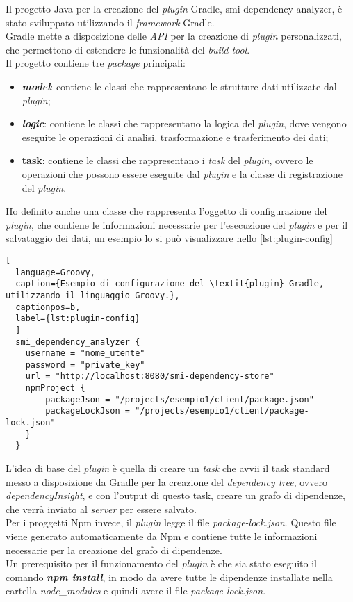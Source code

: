 Il progetto Java per la creazione del \textit{plugin} Gradle, smi-dependency-analyzer, è stato sviluppato utilizzando il \textit{framework} Gradle.\\
Gradle mette a disposizione delle \textit{API} per la creazione di \textit{plugin} personalizzati,
che permettono di estendere le funzionalità del \textit{build tool}.\\
Il progetto contiene tre \textit{package} principali:
\begin{itemize}
  \item \textbf{\textit{model}}: contiene le classi che rappresentano le strutture dati utilizzate dal \textit{plugin};
  \item \textbf{\textit{logic}}: contiene le classi che rappresentano la logica del \textit{plugin}, dove vengono eseguite le operazioni di analisi, 
  trasformazione e trasferimento dei dati;
  \item \textbf{task}: contiene le classi che rappresentano i \textit{task} del \textit{plugin}, ovvero le operazioni che possono essere eseguite dal \textit{plugin} 
  e la classe di registrazione del \textit{plugin}.
\end{itemize}

Ho definito anche una classe che rappresenta l'oggetto di configurazione del \textit{plugin}, 
che contiene le informazioni necessarie per l'esecuzione del \textit{plugin} e per il salvataggio dei dati, un esempio lo si può visualizzare nello \snippet{} \ref*{lst:plugin-config}

\begin{lstlisting}[
  language=Groovy, 
  caption={Esempio di configurazione del \textit{plugin} Gradle, utilizzando il linguaggio Groovy.},
  captionpos=b, 
  label={lst:plugin-config}
  ]
  smi_dependency_analyzer {
    username = "nome_utente"
    password = "private_key"
    url = "http://localhost:8080/smi-dependency-store"
    npmProject {
        packageJson = "/projects/esempio1/client/package.json"
        packageLockJson = "/projects/esempio1/client/package-lock.json"
    }
  }
\end{lstlisting}

L'idea di base del \textit{plugin} è quella di creare un \textit{task} che avvii il task standard messo a disposizione da Gradle
per la creazione del \textit{dependency tree}, ovvero \textit{dependencyInsight}, e con l'output di questo task,
creare un grafo di dipendenze, che verrà inviato al \textit{server} per essere salvato.\\
Per i proggetti Npm invece, il \textit{plugin} legge il file \textit{package-lock.json}. Questo file viene generato automaticamente
da Npm e contiene tutte le informazioni necessarie per la creazione del grafo di dipendenze.\\
Un prerequisito per il funzionamento del \textit{plugin} è che sia stato eseguito il comando \textbf{\textit{npm install}},
in modo da avere tutte le dipendenze installate nella cartella \textit{node\_modules} e quindi avere il file \textit{package-lock.json}.

